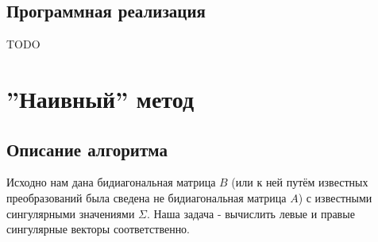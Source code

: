 \subsection{Программная реализация}

TODO






\newpage
\section{''Наивный'' метод}




\subsection{Описание алгоритма}
Исходно нам дана бидиагональная матрица $B$ (или к ней путём известных преобразований была сведена не бидиагональная матрица $A$) с известными сингулярными значениями $\Sigma$. Наша задача - вычислить левые и правые сингулярные векторы соответственно.

